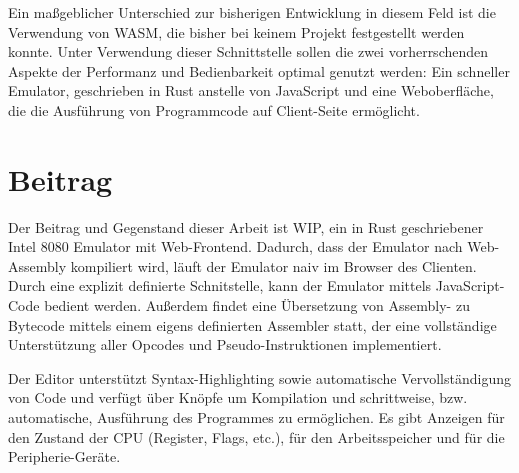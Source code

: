 Ein maßgeblicher Unterschied zur bisherigen Entwicklung in diesem Feld ist die Verwendung von \ac{WASM}, die bisher bei keinem Projekt festgestellt werden konnte. Unter Verwendung dieser Schnittstelle sollen die zwei vorherrschenden Aspekte der Performanz und Bedienbarkeit optimal genutzt werden: Ein schneller Emulator, geschrieben in Rust anstelle von JavaScript und eine Weboberfläche, die die Ausführung von Programmcode auf Client-Seite ermöglicht.

\section{Beitrag}

Der Beitrag und Gegenstand dieser Arbeit ist \ac{WIP}, ein in Rust geschriebener Intel 8080 Emulator mit Web-Frontend. Dadurch, dass der Emulator nach Web-Assembly kompiliert wird, läuft der Emulator naiv im Browser des Clienten. Durch eine explizit definierte Schnitstelle, kann der Emulator mittels JavaScript-Code bedient werden. Außerdem findet eine Übersetzung von Assembly- zu Bytecode mittels einem eigens definierten Assembler statt, der eine vollständige Unterstützung aller Opcodes und Pseudo-Instruktionen implementiert.

Der Editor unterstützt Syntax-Highlighting sowie automatische Vervollständigung von Code und verfügt über Knöpfe um Kompilation und schrittweise, bzw. automatische, Ausführung des Programmes zu ermöglichen.
Es gibt Anzeigen für den Zustand der CPU (Register, Flags, etc.), für den Arbeitsspeicher und für die Peripherie-Geräte.\\
